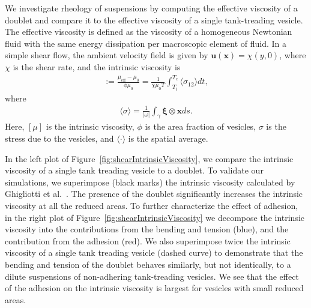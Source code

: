 \documentclass[prf,superscriptaddress,showpacs]{revtex4-1}
\newcommand{\uu}{\mathbf{u}}
\newcommand{\xx}{\mathbf{x}}
\newcommand{\xxi}{\boldsymbol{\xi}}
\begin{document}
We investigate rheology of suspensions by computing the effective
viscosity of a doublet and compare it to the effective viscosity of a
single tank-treading vesicle. The effective viscosity is defined as the
viscosity of a homogeneous Newtonian fluid with the same energy
dissipation per macroscopic element of fluid.  In a simple shear flow,
the ambient velocity field is given by $\uu(\xx) = \chi(y,0)$, where
$\chi$ is the shear rate, and the intrinsic viscosity is
\begin{align*}
  [\mu]:= \frac{\mu_{\mathrm{eff}} - \mu_0}{\phi \mu_0} = 
  \frac{1}{\chi \mu_0 T} \int_{T_i}^{T_e} 
  \langle \sigma_{12} \rangle dt,
\end{align*}
where
\begin{align*}
  \langle \sigma \rangle = \frac{1}{|\omega|} \int_{\gamma}
    \xxi \otimes \xx ds.
\end{align*}
Here, $[\mu]$ is the intrinsic viscosity, $\phi$ is the area fraction of
vesicles, $\sigma$ is the stress due to the vesicles, and $\langle \cdot
\rangle$ is the spatial average.

In the left plot of Figure~\ref{fig:shearIntrinsicViscosity}, we compare
the intrinsic viscosity of a single tank treading vesicle to a doublet.
To validate our simulations, we superimpose (black marks) the intrinsic
viscosity calculated by Ghigliotti et
al.~\cite{GhigliottiBibenMisbah2010_JFM}.  The presence of the doublet
significantly increases the intrinsic viscosity at all the reduced
areas.  To further characterize the effect of adhesion, in the right
plot of Figure~\ref{fig:shearIntrinsicViscosity} we decompose the
intrinsic viscosity into the contributions from the bending and tension
(blue), and the contribution from the adhesion (red).  We also
superimpose twice the intrinsic viscosity of a single tank treading
vesicle (dashed curve) to demonstrate that the bending and tension of
the doublet behaves similarly, but not identically, to a dilute
suspensions of non-adhering tank-treading vesicles.  We see that the
effect of the adhesion on the intrinsic viscosity is largest for
vesicles with small reduced areas.
\end{document}
